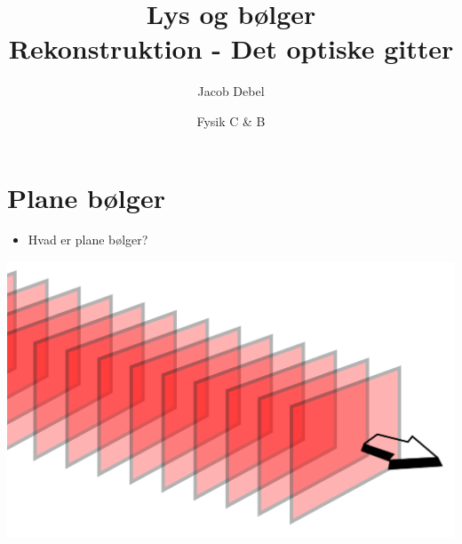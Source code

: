 \documentclass[a4paper, 12pt]{article}
\author{Jacob Debel}
\date{Fysik C \& B}
\title{Lys og bølger\\\medskip
\large Rekonstruktion - Det optiske gitter}
\begin{document}
\maketitle


\section*{Plane bølger}
\label{sec:org8f33e94}
\begin{minipage}{0.3\linewidth}
\begin{itemize}
\item Hvad er plane bølger?
\end{itemize}
\end{minipage}
\vline
\begin{minipage}{0.68\linewidth}
\begin{center}
\includegraphics[width=.9\linewidth]{./img/plan_boelge.png}
\end{center}
\end{minipage}



\vfill
\end{document}
